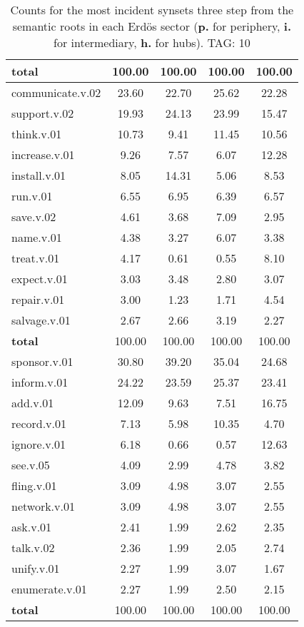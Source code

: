 \begin{table}[h!]
\begin{center}
\begin{tabular}{| l || c | c | c | c |}
{{\bf total}} & 100.00  & 100.00  & 100.00  & 100.00 \\\hline\hline\hline
communicate.v.02 & 23.60  & 22.70  & 25.62  & 22.28 \\\hline
support.v.02 & 19.93  & 24.13  & 23.99  & 15.47 \\\hline
think.v.01 & 10.73  & 9.41  & 11.45  & 10.56 \\\hline
increase.v.01 & 9.26  & 7.57  & 6.07  & 12.28 \\\hline
install.v.01 & 8.05  & 14.31  & 5.06  & 8.53 \\\hline
run.v.01 & 6.55  & 6.95  & 6.39  & 6.57 \\\hline
save.v.02 & 4.61  & 3.68  & 7.09  & 2.95 \\\hline
name.v.01 & 4.38  & 3.27  & 6.07  & 3.38 \\\hline
treat.v.01 & 4.17  & 0.61  & 0.55  & 8.10 \\\hline
expect.v.01 & 3.03  & 3.48  & 2.80  & 3.07 \\\hline
repair.v.01 & 3.00  & 1.23  & 1.71  & 4.54 \\\hline
salvage.v.01 & 2.67  & 2.66  & 3.19  & 2.27 \\\hline\hline
{{\bf total}} & 100.00  & 100.00  & 100.00  & 100.00 \\\hline\hline\hline
sponsor.v.01 & 30.80  & 39.20  & 35.04  & 24.68 \\\hline
inform.v.01 & 24.22  & 23.59  & 25.37  & 23.41 \\\hline
add.v.01 & 12.09  & 9.63  & 7.51  & 16.75 \\\hline
record.v.01 & 7.13  & 5.98  & 10.35  & 4.70 \\\hline
ignore.v.01 & 6.18  & 0.66  & 0.57  & 12.63 \\\hline
see.v.05 & 4.09  & 2.99  & 4.78  & 3.82 \\\hline
fling.v.01 & 3.09  & 4.98  & 3.07  & 2.55 \\\hline
network.v.01 & 3.09  & 4.98  & 3.07  & 2.55 \\\hline
ask.v.01 & 2.41  & 1.99  & 2.62  & 2.35 \\\hline
talk.v.02 & 2.36  & 1.99  & 2.05  & 2.74 \\\hline
unify.v.01 & 2.27  & 1.99  & 3.07  & 1.67 \\\hline
enumerate.v.01 & 2.27  & 1.99  & 2.50  & 2.15 \\\hline\hline
{{\bf total}} & 100.00  & 100.00  & 100.00  & 100.00 \\\hline
\end{tabular}
\caption{Counts for the most incident synsets three step from the semantic roots in each Erd\"os sector ({\bf p.} for periphery, {\bf i.} for intermediary, {\bf h.} for hubs). TAG: 10}
\end{center}
\end{table}